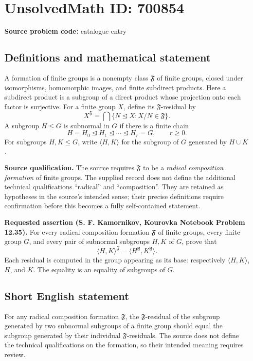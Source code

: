 \documentclass[11pt]{article}
\begin{document}
\section*{UnsolvedMath ID: 700854}
\textbf{Source problem code:} catalogue entry
\subsection{Definitions and mathematical statement}
A formation of finite groups is a nonempty class \(\mathfrak F\) of finite groups, closed under isomorphisms, homomorphic images, and finite subdirect products. Here a subdirect product is a subgroup of a direct product whose projection onto each factor is surjective. For a finite group \(X\), define its \(\mathfrak F\)-residual by
\[
X^{\mathfrak F}=\bigcap\{N\trianglelefteq X:X/N\in\mathfrak F\}.
\]
A subgroup \(H\leq G\) is subnormal in \(G\) if there is a finite chain
\[
H=H_0\trianglelefteq H_1\trianglelefteq\cdots\trianglelefteq H_r=G,
\qquad r\geq 0.
\]
For subgroups \(H,K\leq G\), write \(\langle H,K\rangle\) for the subgroup of \(G\) generated by \(H\cup K\).

\textbf{Source qualification.} The source requires \(\mathfrak F\) to be a \emph{radical composition formation} of finite groups. The supplied record does not define the additional technical qualifications ``radical'' and ``composition''. They are retained as hypotheses in the source's intended sense; their precise definitions require confirmation before this becomes a fully self-contained statement.

\textbf{Requested assertion (S. F. Kamornikov, Kourovka Notebook Problem 12.35).} For every radical composition formation \(\mathfrak F\) of finite groups, every finite group \(G\), and every pair of subnormal subgroups \(H,K\) of \(G\), prove that
\[
\bigl\langle H,K\bigr\rangle^{\mathfrak F}
=
\bigl\langle H^{\mathfrak F},K^{\mathfrak F}\bigr\rangle.
\]
Each residual is computed in the group appearing as its base: respectively \(\langle H,K\rangle\), \(H\), and \(K\). The equality is an equality of subgroups of \(G\).
\subsection{Short English statement}
For any radical composition formation \(\mathfrak F\), the \(\mathfrak F\)-residual of the subgroup generated by two subnormal subgroups of a finite group should equal the subgroup generated by their individual \(\mathfrak F\)-residuals. The source does not define the technical qualifications on the formation, so their intended meaning requires review.
\end{document}
